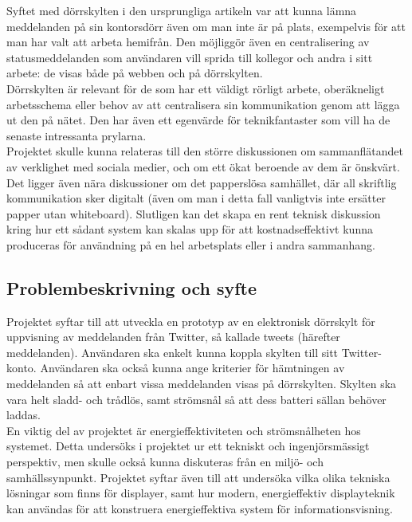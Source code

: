 \documentclass[a4paper,11pt]{article}
\begin{document}
Syftet med dörrskylten i den ursprungliga artikeln var att kunna lämna meddelanden på sin kontorsdörr även om man inte är på plats, exempelvis för att man har valt att arbeta hemifrån. Den möjliggör även en centralisering av statusmeddelanden som användaren vill sprida till kollegor och andra i sitt arbete: de visas både på webben och på dörrskylten.\\

Dörrskylten är relevant för de som har ett väldigt rörligt arbete, oberäkneligt arbetsschema eller behov av att centralisera sin kommunikation genom att lägga ut den på nätet. Den har även ett egenvärde för teknikfantaster som vill ha de senaste intressanta prylarna.\\

Projektet skulle kunna relateras till den större diskussionen om sammanflätandet av verklighet med sociala medier, och om ett ökat beroende av dem är önskvärt. Det ligger även nära diskussioner om det papperslösa samhället, där all skriftlig kommunikation sker digitalt (även om man i detta fall vanligtvis inte ersätter papper utan whiteboard). Slutligen kan det skapa en rent teknisk diskussion kring hur ett sådant system kan skalas upp för att kostnadseffektivt kunna produceras för användning på en hel arbetsplats eller i andra sammanhang.

\subsection{Problembeskrivning och syfte}
Projektet syftar till att utveckla en prototyp av en elektronisk dörrskylt för uppvisning av meddelanden från Twitter, så kallade tweets (härefter meddelanden). Användaren ska enkelt kunna koppla skylten till sitt Twitter-konto. Användaren ska också kunna ange kriterier för hämtningen av meddelanden så att enbart vissa meddelanden visas på dörrskylten. Skylten ska vara helt sladd- och trådlös, samt strömsnål så att dess batteri sällan behöver laddas.\\

En viktig del av projektet är energieffektiviteten och strömsnålheten hos systemet. Detta undersöks i projektet ur ett tekniskt och ingenjörsmässigt perspektiv, men skulle också kunna diskuteras från en miljö- och samhällssynpunkt. Projektet syftar även till att undersöka vilka olika tekniska lösningar som finns för displayer, samt hur modern, energieffektiv displayteknik kan användas för att konstruera energieffektiva system för informationsvisning.\\
\end{document}
